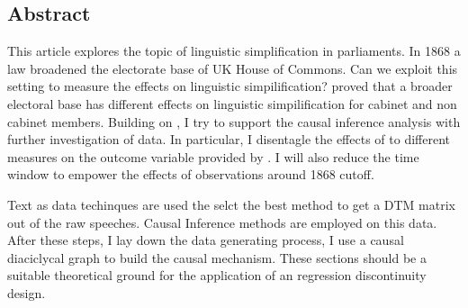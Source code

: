 
\begin{center}
    \subsection*{Abstract}
\end{center}
This article explores the topic of linguistic simplification in parliaments. In 1868 a law broadened the electorate base of UK House of Commons. Can we exploit this setting to measure the effects on linguistic simpilification?
\textcite{spirlingDemocratizationLinguisticComplexity2016} proved that a broader electoral base has different effects on linguistic simpilification for cabinet and non cabinet members.
Building on  \textcite{spirlingDemocratizationLinguisticComplexity2016}, I try to support the causal inference analysis with further investigation of data. In particular, I disentagle the effects of to different measures on the outcome variable provided by \textcite{spirlingDemocratizationLinguisticComplexity2016}. I will also reduce the time window to empower the effects of observations around 1868 cutoff.

\vspace*{1em}
Text as data techinques are used the selct the best method to get a DTM matrix out of the raw speeches. Causal Inference methods are employed on this data. After these steps, I lay down the data generating process, I use a causal diaciclycal graph to build the causal mechanism. These sections should be a suitable theoretical ground for the application of an regression discontinuity design.


